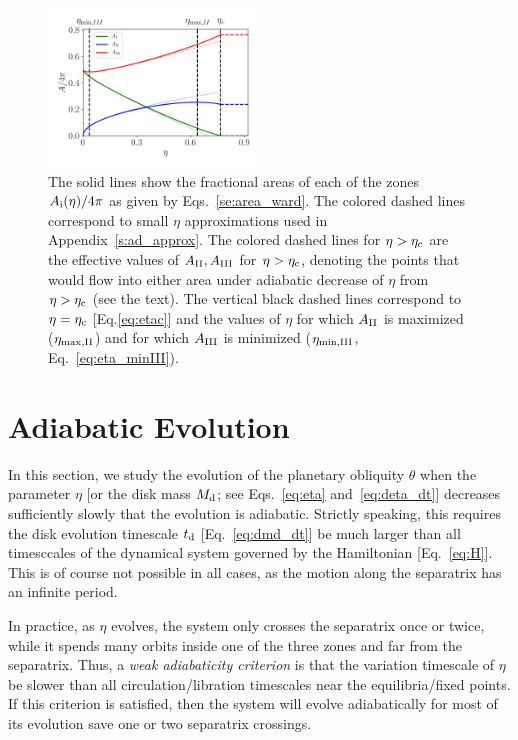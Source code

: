 \documentclass[
        fleqn,
        usenatbib,
    ]{mnras}
\begin{document}
\begin{figure}
    \centering
    \includegraphics[width=0.5\textwidth]{plots_diskdisp/1_areas.png}
    \caption{The solid lines show the fractional areas of each of the zones
    $A_{\rm i}(\eta) / 4\pi$ as given by Eqs.~\eqref{se:area_ward}. The colored
    dashed lines correspond to small $\eta$ approximations used in
    Appendix~\ref{s:ad_approx}. The colored dashed lines for $\eta > \eta_{\rm
    c}$ are the effective values of $A_{\rm II}, A_{\rm III}$ for $\eta >
    \eta_{\rm c}$, denoting the points that would flow into either area under
    adiabatic decrease of $\eta$ from $\eta > \eta_{\rm c}$ (see the text). The vertical black
    dashed lines correspond to $\eta = \eta_{\rm c}$ [Eq.\eqref{eq:etac}] and
    the values of $\eta$ for which $A_{\rm II}$ is maximized ($\eta_{\rm \max,
    II}$) and for which $A_{\rm III}$ is minimized ($\eta_{\rm \min, III}$,
    Eq.~\eqref{eq:eta_minIII}).}\label{fig:eq_areas}
\end{figure}

\section{Adiabatic Evolution}\label{s:ad}

In this section, we study the evolution of the planetary obliquity $\theta$ when
the parameter $\eta$ [or the disk mass $M_{\rm d}$; see Eqs.~\eqref{eq:eta}
and~\eqref{eq:deta_dt}] decreases sufficiently slowly that the evolution is
adiabatic. Strictly speaking, this requires the disk evolution timescale $t_{\rm
d}$ [Eq.~\eqref{eq:dmd_dt}] be much larger than all timesccales of the dynamical
system governed by the Hamiltonian [Eq.~\eqref{eq:H}]. This is of course not
possible in all cases, as the motion along the separatrix has an infinite
period.

In practice, as $\eta$ evolves, the system only crosses the separatrix once or
twice, while it spends many orbits inside one of the three zones and far from
the separatrix. Thus, a \emph{weak adiabaticity criterion} is that the variation
timescale of $\eta$ be slower than all circulation/libration timescales near the
equilibria/fixed points. If this criterion is satisfied, then the system will
evolve adiabatically for most of its evolution save one or two separatrix
crossings.
\end{document}
